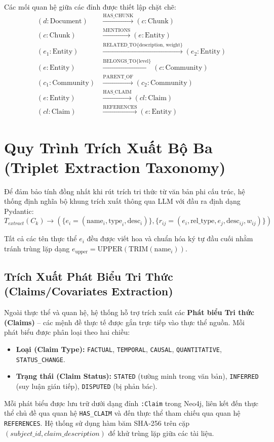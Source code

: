 \documentclass[11pt,a4paper]{report}
\begin{document}
Các mối quan hệ giữa các đỉnh được thiết lập chặt chẽ:
\begin{align}
(d:\text{Document}) &\xrightarrow{\text{HAS\_CHUNK}} (c:\text{Chunk}) \\
(c:\text{Chunk}) &\xrightarrow{\text{MENTIONS}} (e:\text{Entity}) \\
(e_1:\text{Entity}) &\xrightarrow{\text{RELATED\_TO} \{\text{description, weight}\}} (e_2:\text{Entity}) \\
(e:\text{Entity}) &\xrightarrow{\text{BELONGS\_TO} \{\text{level}\}} (c:\text{Community}) \\
(c_1:\text{Community}) &\xrightarrow{\text{PARENT\_OF}} (c_2:\text{Community}) \\
(e:\text{Entity}) &\xrightarrow{\text{HAS\_CLAIM}} (cl:\text{Claim}) \\
(cl:\text{Claim}) &\xrightarrow{\text{REFERENCES}} (e:\text{Entity})
\end{align}

\section{Quy Trình Trích Xuất Bộ Ba (Triplet Extraction Taxonomy)}
Để đảm bảo tính đồng nhất khi rút trích tri thức từ văn bản phi cấu trúc, hệ thống định nghĩa bộ khung trích xuất thông qua LLM với đầu ra định dạng Pydantic:
\begin{equation}
T_{extract}(C_k) \to \left( \{e_i = (\text{name}_i, \text{type}_i, \text{desc}_i)\}, \{r_{ij} = (e_i, \text{rel\_type}, e_j, \text{desc}_{ij}, w_{ij})\}\right)
\end{equation}

Tất cả các tên thực thể $e_i$ đều được viết hoa và chuẩn hóa ký tự đầu cuối nhằm tránh trùng lặp dạng $e_{\text{upper}} = \text{UPPER}(\text{TRIM}(\text{name}_i))$.

\subsection{Trích Xuất Phát Biểu Tri Thức (Claims/Covariates Extraction)}
Ngoài thực thể và quan hệ, hệ thống hỗ trợ trích xuất các \textbf{Phát biểu Tri thức (Claims)} -- các mệnh đề thực tế được gắn trực tiếp vào thực thể nguồn. Mỗi phát biểu được phân loại theo hai chiều:
\begin{itemize}
    \item \textbf{Loại (Claim Type):} \texttt{FACTUAL}, \texttt{TEMPORAL}, \texttt{CAUSAL}, \texttt{QUANTITATIVE}, \texttt{STATUS\_CHANGE}.
    \item \textbf{Trạng thái (Claim Status):} \texttt{STATED} (tường minh trong văn bản), \texttt{INFERRED} (suy luận gián tiếp), \texttt{DISPUTED} (bị phản bác).
\end{itemize}
Mỗi phát biểu được lưu trữ dưới dạng đỉnh \texttt{:Claim} trong Neo4j, liên kết đến thực thể chủ đề qua quan hệ \texttt{HAS\_CLAIM} và đến thực thể tham chiếu qua quan hệ \texttt{REFERENCES}. Hệ thống sử dụng hàm băm SHA-256 trên cặp $(subject\_id, claim\_description)$ để khử trùng lặp giữa các tài liệu.
\end{document}
